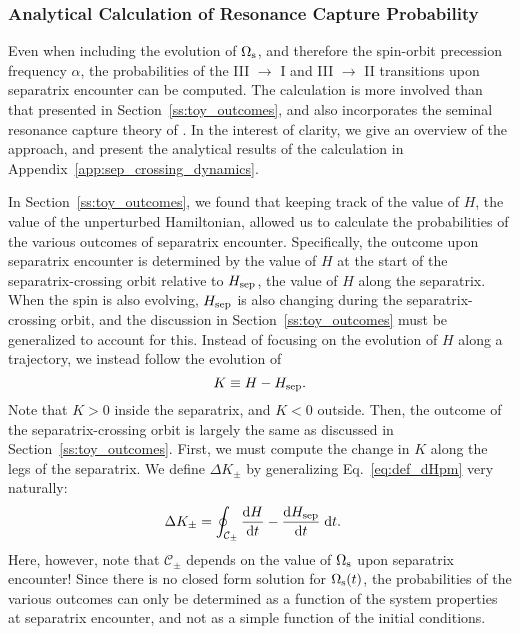 \documentclass[
        fleqn,
        usenatbib,
    ]{mnras}
\newcommand*{\rd}[2]{\frac{\mathrm{d}#1}{\mathrm{d}#2}}
\begin{document}
\subsubsection{Analytical Calculation of Resonance Capture Probability
}\label{ss:phop_weaktide}

Even when including the evolution of $\Omega_{\rm s}$, and therefore the
spin-orbit precession frequency $\alpha$, the probabilities of the III $\to$ I
and III $\to$ II transitions upon separatrix encounter can be computed. The
calculation is more involved than that presented in
Section~\ref{ss:toy_outcomes}, and also incorporates the seminal resonance
capture theory of \citet{henrard1982}. In the interest of clarity, we give an
overview of the approach, and present the analytical results of the calculation
in Appendix~\ref{app:sep_crossing_dynamics}.

In Section~\ref{ss:toy_outcomes}, we found that keeping track of the value of
$H$, the value of the
unperturbed Hamiltonian, allowed us to calculate the probabilities of the
various outcomes of separatrix encounter. Specifically, the outcome upon separatrix
encounter is determined by the value of $H$ at the start of the
separatrix-crossing orbit relative to $H_{\rm sep}$, the value of $H$ along the
separatrix. When the spin is also evolving, $H_{\rm sep}$ is also
changing during the separatrix-crossing orbit, and the discussion in
Section~\ref{ss:toy_outcomes} must be generalized to account for this. Instead
of focusing on the evolution of $H$ along a trajectory, we instead follow the
evolution of
\begin{equation}
    K \equiv H - H_{\rm sep}.
\end{equation}
Note that $K > 0$ inside the separatrix, and $K < 0$ outside. Then, the outcome
of the separatrix-crossing orbit is largely the same as discussed in
Section~\ref{ss:toy_outcomes}. First, we must compute the change in $K$ along
the legs of the separatrix. We define $\Delta K_{\pm}$ by generalizing
Eq.~\eqref{eq:def_dHpm} very naturally:
\begin{align}
    \Delta K_{\pm} &= \oint_{\mathcal{C}_{\pm}} \rd{H}{t}
        - \rd{H_{\rm sep}}{t}\;\mathrm{d}t.\label{eq:def_dK_weaktide}
\end{align}
Here, however, note that $\mathcal{C}_{\pm}$ depends on the value of
$\Omega_{\rm s}$ upon separatrix encounter! Since there is no closed form
solution for $\Omega_{\rm s}(t)$, the probabilities of the various outcomes can
only be determined as a function of the system properties at separatrix
encounter, and not as a simple function of the initial conditions.
\end{document}
